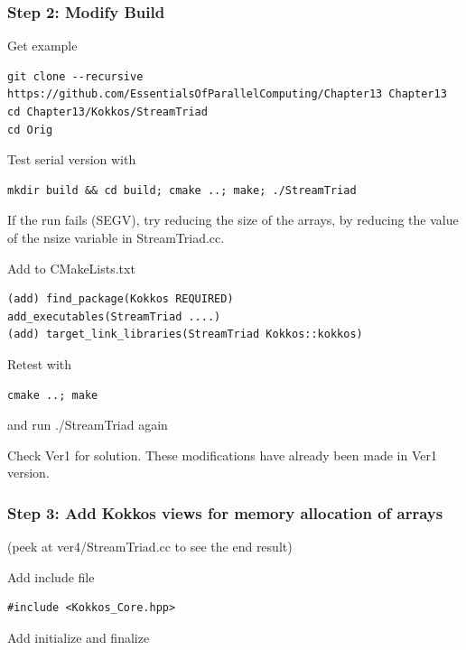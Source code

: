 \documentclass[
]{article}
\begin{document}
\hypertarget{step-2-modify-build}{%
\subsubsection{Step 2: Modify Build}\label{step-2-modify-build}}

Get example

\begin{verbatim}
git clone --recursive https://github.com/EssentialsOfParallelComputing/Chapter13 Chapter13
cd Chapter13/Kokkos/StreamTriad
cd Orig
\end{verbatim}

Test serial version with

\begin{verbatim}
mkdir build && cd build; cmake ..; make; ./StreamTriad
\end{verbatim}

If the run fails (SEGV), try reducing the size of the arrays, by
reducing the value of the nsize variable in StreamTriad.cc.

Add to CMakeLists.txt

\begin{verbatim}
(add) find_package(Kokkos REQUIRED)
add_executables(StreamTriad ....)
(add) target_link_libraries(StreamTriad Kokkos::kokkos)
\end{verbatim}

Retest with

\begin{verbatim}
cmake ..; make
\end{verbatim}

and run ./StreamTriad again

Check Ver1 for solution. These modifications have already been made in
Ver1 version.

\hypertarget{step-3-add-kokkos-views-for-memory-allocation-of-arrays}{%
\subsubsection{Step 3: Add Kokkos views for memory allocation of
arrays}\label{step-3-add-kokkos-views-for-memory-allocation-of-arrays}}

(peek at ver4/StreamTriad.cc to see the end result)

Add include file

\begin{verbatim}
#include <Kokkos_Core.hpp>
\end{verbatim}

Add initialize and finalize
\end{document}
